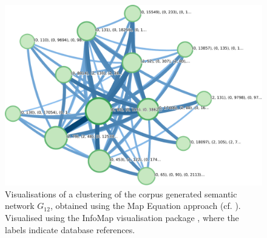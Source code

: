 \documentclass{prettytex/ox/mmsc-special-topic}
\title{\topictitle}
\author{Candidate \candidatenumber}
\date{\today}
\begin{document}
  \pagestyle{plain}
  \mmscSpecialHeader

  \begin{abstract}
    \label{abstract}
    In this work we will attempt to compare methods in the domain of semantic field tagging by considering a language literature corpus as a large graph of neighbouring words. The network is built by performing part-of-speech tagging iteratively on the entire corpus and linking together principal words that are connected in a neighbouring sense up to a radius of $r$ words.
    The resulting graph $G_r$ is then analysed using community detection methods such as \textit{Louvain Clustering}, \textit{Chinese Whispers}, \textit{Clauset Greedy Modularity} and other clustering approaches which we only discuss briefly.
    We derive the gain in modularity presented in the original work \cite{lambiotte-louvain-clustering} upon atomic modification of the clusters $\{C_i\}_{i=1}^{n_C}$.
    The Chinese Whispers algorithm is a simple graph clustering method originating from research in Natural Language Processing \parencite{cw-biemann} and it is well-established for semantic field analysis.
    The abovementioned algorithms are applied to a real-world corpus of the Latin language, working with a graph of 10843 nodes and 2.4 million edges.
    We compare them in terms of output modularity, runtime and number of clusters on the graphs introduced, which we compare to the eigengap in the spectrum of the graph Laplacian.
  \end{abstract}

  \begin{figure}[H]
    \centering
    \includegraphics[width=0.65\linewidth]{figures/library-graph-12.pajek.ftree.pdf}
    \caption{Visualisations of a clustering of the corpus generated semantic network $G_{12}$, obtained using the Map Equation approach (cf. ). Visualised using the InfoMap visualisation package \parencite{mapequation}, where the labels indicate database references.}
    \label{fig:mapequation}
  \end{figure}
\end{document}
